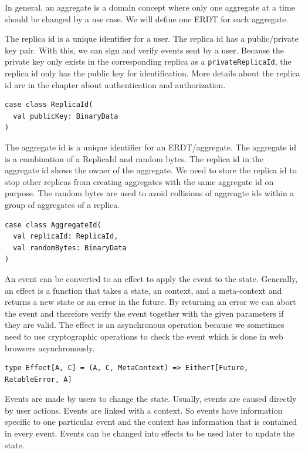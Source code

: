 \documentclass[
	english,
	ruledheaders=section,   %
	class=report,		    %
	thesis={type=bachelor}, %
	accentcolor=9c,			%
	custommargins=true,    %
	marginpar=false,        %
	parskip=half-,          %
	fontsize=11pt,          %
]{tudapub}
\begin{document}
In general, an aggregate is a domain concept where only one aggregate at a time should be changed by a use case. We will define one ERDT for each aggregate. ~\cite{evans2004ddd}

The replica id is a unique identifier for a user. The replica id has a public/private key pair. With this, we can sign and verify events sent by a user. Because the private key only exists in the corresponding replica as a \texttt{privateReplicaId}, the replica id only has the public key for identification. More details about the replica id are in the chapter about authentication and authorization.

\begin{lstlisting}
case class ReplicaId(
  val publicKey: BinaryData
)
\end{lstlisting}

The aggregate id is a unique identifier for an ERDT/aggregate. The aggregate id is a combination of a ReplicaId and random bytes. The replica id in the aggregate id shows the owner of the aggregate. We need to store the replica id to stop other replicas from creating aggregates with the same aggregate id on purpose. The random bytes are used to avoid collisions of aggreagte ids within a group of aggregates of a replica.

\begin{lstlisting}
case class AggregateId(
  val replicaId: ReplicaId,
  val randomBytes: BinaryData
)
\end{lstlisting}

An event can be converted to an effect to apply the event to the state. Generally, an effect is a function that takes a state, an context, and a meta-context and returns a new state or an error in the future. By returning an error we can abort the event and therefore verify the event together with the given parameters if they are valid. The effect is an asynchronous operation because we sometimes need to use cryptographic operations to check the event which is done in web browsers asynchronously.

\begin{lstlisting}
type Effect[A, C] = (A, C, MetaContext) => EitherT[Future, RatableError, A]
\end{lstlisting}

Events are made by users to change the state. Usually, events are caused directly by user actions. Events are linked with a context. So events have information specific to one particular event and the context has information that is contained in every event. Events can be changed into effects to be used later to update the state.
\end{document}
